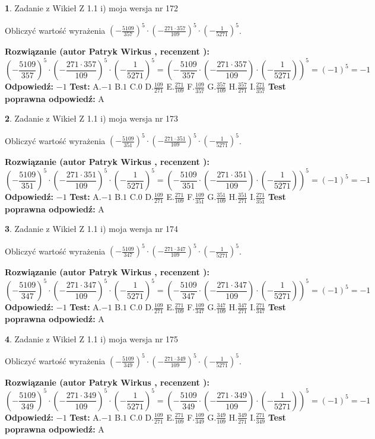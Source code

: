 \documentclass[12pt, a4paper]{article}
\theoremstyle{definition} %
\newtheorem{zad}{}
\newcommand{\zadStart}[1]{\begin{zad}#1\newline}
\newcommand{\zadStop}{\end{zad}}
\newcommand{\rozwStart}[2]{\noindent \textbf{Rozwiązanie (autor #1 , recenzent #2): }\newline}
\newcommand{\rozwStop}{\newline}
\newcommand{\odpStart}{\noindent \textbf{Odpowiedź:}\newline}
\newcommand{\odpStop}{\newline}
\newcommand{\testStart}{\noindent \textbf{Test:}\newline}
\newcommand{\testStop}{\newline}
\newcommand{\kluczStart}{\noindent \textbf{Test poprawna odpowiedź:}\newline}
\newcommand{\kluczStop}{\newline}
\begin{document}
\zadStart{Zadanie z Wikieł Z 1.1 i) moja wersja nr 172}

Obliczyć wartość wyrażenia $(-\frac{5109}{357})^{5} \cdot (-\frac{271 \cdot 357}{109})^{5} \cdot (-\frac{1}{5271})^{5}$.
\zadStop
\rozwStart{Patryk Wirkus}{}
$$(-\frac{5109}{357})^{5} \cdot (-\frac{271 \cdot 357}{109})^{5} \cdot (-\frac{1}{5271})^{5} = (-\frac{5109}{357} \cdot (-\frac{271 \cdot 357}{109}) \cdot (-\frac{1}{5271}))^{5} = (-1)^{5} = -1$$
\rozwStop
\odpStart
$-1$
\odpStop
\testStart
A.$-1$ B.$1$ C.$0$ D.$\frac{109}{271}$ E.$\frac{271}{109}$
F.$\frac{109}{357}$ G.$\frac{357}{109}$
H.$\frac{357}{271}$
I.$\frac{271}{357}$
\testStop
\kluczStart
A
\kluczStop



\zadStart{Zadanie z Wikieł Z 1.1 i) moja wersja nr 173}

Obliczyć wartość wyrażenia $(-\frac{5109}{351})^{5} \cdot (-\frac{271 \cdot 351}{109})^{5} \cdot (-\frac{1}{5271})^{5}$.
\zadStop
\rozwStart{Patryk Wirkus}{}
$$(-\frac{5109}{351})^{5} \cdot (-\frac{271 \cdot 351}{109})^{5} \cdot (-\frac{1}{5271})^{5} = (-\frac{5109}{351} \cdot (-\frac{271 \cdot 351}{109}) \cdot (-\frac{1}{5271}))^{5} = (-1)^{5} = -1$$
\rozwStop
\odpStart
$-1$
\odpStop
\testStart
A.$-1$ B.$1$ C.$0$ D.$\frac{109}{271}$ E.$\frac{271}{109}$
F.$\frac{109}{351}$ G.$\frac{351}{109}$
H.$\frac{351}{271}$
I.$\frac{271}{351}$
\testStop
\kluczStart
A
\kluczStop



\zadStart{Zadanie z Wikieł Z 1.1 i) moja wersja nr 174}

Obliczyć wartość wyrażenia $(-\frac{5109}{347})^{5} \cdot (-\frac{271 \cdot 347}{109})^{5} \cdot (-\frac{1}{5271})^{5}$.
\zadStop
\rozwStart{Patryk Wirkus}{}
$$(-\frac{5109}{347})^{5} \cdot (-\frac{271 \cdot 347}{109})^{5} \cdot (-\frac{1}{5271})^{5} = (-\frac{5109}{347} \cdot (-\frac{271 \cdot 347}{109}) \cdot (-\frac{1}{5271}))^{5} = (-1)^{5} = -1$$
\rozwStop
\odpStart
$-1$
\odpStop
\testStart
A.$-1$ B.$1$ C.$0$ D.$\frac{109}{271}$ E.$\frac{271}{109}$
F.$\frac{109}{347}$ G.$\frac{347}{109}$
H.$\frac{347}{271}$
I.$\frac{271}{347}$
\testStop
\kluczStart
A
\kluczStop



\zadStart{Zadanie z Wikieł Z 1.1 i) moja wersja nr 175}

Obliczyć wartość wyrażenia $(-\frac{5109}{349})^{5} \cdot (-\frac{271 \cdot 349}{109})^{5} \cdot (-\frac{1}{5271})^{5}$.
\zadStop
\rozwStart{Patryk Wirkus}{}
$$(-\frac{5109}{349})^{5} \cdot (-\frac{271 \cdot 349}{109})^{5} \cdot (-\frac{1}{5271})^{5} = (-\frac{5109}{349} \cdot (-\frac{271 \cdot 349}{109}) \cdot (-\frac{1}{5271}))^{5} = (-1)^{5} = -1$$
\rozwStop
\odpStart
$-1$
\odpStop
\testStart
A.$-1$ B.$1$ C.$0$ D.$\frac{109}{271}$ E.$\frac{271}{109}$
F.$\frac{109}{349}$ G.$\frac{349}{109}$
H.$\frac{349}{271}$
I.$\frac{271}{349}$
\testStop
\kluczStart
A
\kluczStop
\end{document}

